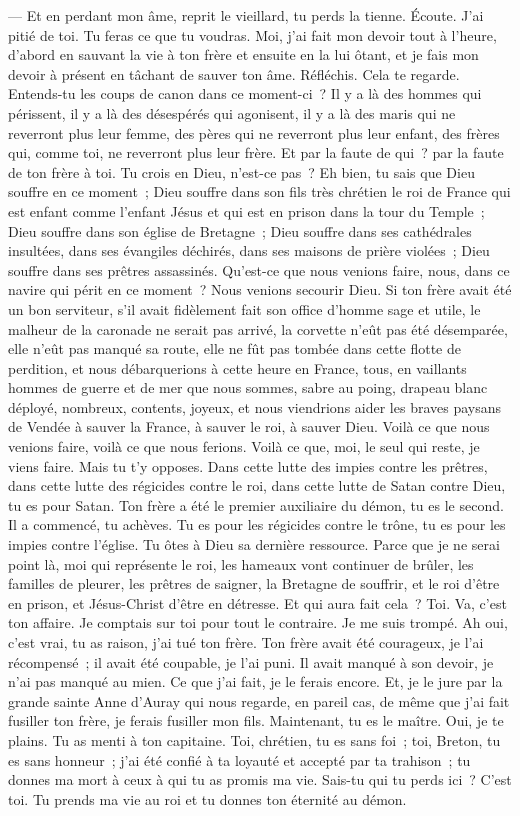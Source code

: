 \documentclass[french,twoside]{book} %
\begin{document}
— Et en perdant mon âme, reprit le vieillard, tu perds la tienne. Écoute. J’ai pitié de toi. Tu feras ce que tu voudras. Moi, j’ai fait mon devoir tout à l’heure, d’abord en sauvant la vie à ton frère et ensuite en la lui ôtant, et je fais mon devoir à présent en tâchant de sauver ton âme. Réfléchis. Cela te regarde. Entends-tu les coups de canon dans ce moment-ci ? Il  y a là des hommes qui périssent, il y a là des désespérés qui agonisent, il y a là des maris qui ne reverront plus leur femme, des pères qui ne reverront plus leur enfant, des frères qui, comme toi, ne reverront plus leur frère. Et par la faute de qui ? par la faute de ton frère à toi. Tu crois en Dieu, n’est-ce pas ? Eh bien, tu sais que Dieu souffre en ce moment ; Dieu souffre dans son fils très chrétien le roi de France qui est enfant comme l’enfant Jésus et qui est en prison dans la tour du Temple ; Dieu souffre dans son église de Bretagne ; Dieu souffre dans ses cathédrales insultées, dans ses évangiles déchirés, dans ses maisons de prière violées ; Dieu souffre dans ses prêtres assassinés. Qu’est-ce que nous venions faire, nous, dans ce navire qui périt en ce moment ? Nous venions secourir Dieu. Si ton frère avait été un bon serviteur, s’il avait fidèlement fait son office d’homme sage et utile, le malheur de la caronade ne serait pas arrivé, la corvette n’eût pas été désemparée, elle n’eût pas manqué sa route, elle ne fût pas tombée dans cette flotte de perdition, et nous débarquerions à cette heure en France, tous, en vaillants hommes de guerre et de mer que nous sommes, sabre au poing, drapeau blanc déployé, nombreux, contents, joyeux, et nous viendrions aider les braves paysans de Vendée à sauver la France, à sauver le roi, à sauver Dieu. Voilà ce que nous venions faire, voilà ce que nous ferions. Voilà ce que, moi, le seul qui reste, je viens faire. Mais tu t’y opposes. Dans cette lutte des impies contre les prêtres, dans cette lutte des  régicides contre le roi, dans cette lutte de Satan contre Dieu, tu es pour Satan. Ton frère a été le premier auxiliaire du démon, tu es le second. Il a commencé, tu achèves. Tu es pour les régicides contre le trône, tu es pour les impies contre l’église. Tu ôtes à Dieu sa dernière ressource. Parce que je ne serai point là, moi qui représente le roi, les hameaux vont continuer de brûler, les familles de pleurer, les prêtres de saigner, la Bretagne de souffrir, et le roi d’être en prison, et Jésus-Christ d’être en détresse. Et qui aura fait cela ? Toi. Va, c’est ton affaire. Je comptais sur toi pour tout le contraire. Je me suis trompé. Ah oui, c’est vrai, tu as raison, j’ai tué ton frère. Ton frère avait été courageux, je l’ai récompensé ; il avait été coupable, je l’ai puni. Il avait manqué à son devoir, je n’ai pas manqué au mien. Ce que j’ai fait, je le ferais encore. Et, je le jure par la grande sainte Anne d’Auray qui nous regarde, en pareil cas, de même que j’ai fait fusiller ton frère, je ferais fusiller mon fils. Maintenant, tu es le maître. Oui, je te plains. Tu as menti à ton capitaine. Toi, chrétien, tu es sans foi ; toi, Breton, tu es sans honneur ; j’ai été confié à ta loyauté et accepté par ta trahison ; tu donnes ma mort à ceux à qui tu as promis ma vie. Sais-tu qui tu perds ici ? C’est toi. Tu prends ma vie au roi et tu donnes ton éternité au démon. 
\end{document}
